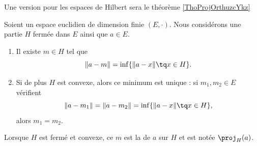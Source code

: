 Une version pour les espaces de Hilbert sera le théorème \ref{ThoProjOrthuzcYkz}
\begin{propositionDef}      \label{DEFooHXJTooNPyDFQ}
	Soient un espace euclidien de dimension finie \( (E,\cdot)\). Nous considérons une partie \( H\) fermée dans \( E\) ainsi que \( a\in E\).
	\begin{enumerate}
		\item
		      Il existe \( m\in H\) tel que
		      \begin{equation}
			      \| a-m \|=\inf\{ \| a-x \|\tq x\in H \}.
		      \end{equation}
		\item
		      Si de plus \( H\) est convexe, alors ce minimum est unique : si \( m_1,m_2\in E\) vérifient
		      \begin{equation}
			      \| a-m_1 \|=\| a-m_2 \|=\inf\{ \| a-x \|\tq x\in H \},
		      \end{equation}
		      alors \( m_1=m_2\).
	\end{enumerate}
	Lorsque \( H\) est fermé et convexe, ce \( m\) est la  de \( a\) sur \( H\) et est notée \( \proj_H(a)\).
\end{propositionDef}

